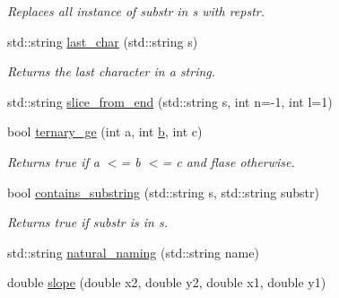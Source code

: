 \begin{DoxyCompactItemize}
\begin{DoxyCompactList}\small\item\em Replaces all instance of {\itshape substr} in {\itshape s} with {\itshape repstr}. \end{DoxyCompactList}\item 
std\+::string \hyperlink{namespacepyne_a97495e780a8fd91e4604e5a7b2f84f3e}{last\+\_\+char} (std\+::string s)\hypertarget{namespacepyne_a97495e780a8fd91e4604e5a7b2f84f3e}{}\label{namespacepyne_a97495e780a8fd91e4604e5a7b2f84f3e}

\begin{DoxyCompactList}\small\item\em Returns the last character in a string. \end{DoxyCompactList}\item 
std\+::string \hyperlink{namespacepyne_abe1c85ef0d36e8e3eeb02076db773c88}{slice\+\_\+from\+\_\+end} (std\+::string s, int n=-\/1, int l=1)
\item 
bool \hyperlink{namespacepyne_a5bf23fa851054a44f872c65f5592db8c}{ternary\+\_\+ge} (int a, int \hyperlink{namespacepyne_a12664d38214170260d6a69c4f5dda8da}{b}, int c)\hypertarget{namespacepyne_a5bf23fa851054a44f872c65f5592db8c}{}\label{namespacepyne_a5bf23fa851054a44f872c65f5592db8c}

\begin{DoxyCompactList}\small\item\em Returns true if {\itshape a} $<$= {\itshape b} $<$= {\itshape c} and flase otherwise. \end{DoxyCompactList}\item 
bool \hyperlink{namespacepyne_aacdc15f9fd3df02a25971257b3f83b47}{contains\+\_\+substring} (std\+::string s, std\+::string substr)\hypertarget{namespacepyne_aacdc15f9fd3df02a25971257b3f83b47}{}\label{namespacepyne_aacdc15f9fd3df02a25971257b3f83b47}

\begin{DoxyCompactList}\small\item\em Returns true if {\itshape substr} is in {\itshape s}. \end{DoxyCompactList}\item 
std\+::string \hyperlink{namespacepyne_aa136c046c495673c1167472b96901e33}{natural\+\_\+naming} (std\+::string name)
\item 
double \hyperlink{namespacepyne_a98db52b7243a761ad6f2819478eeda30}{slope} (double x2, double y2, double x1, double y1)\hypertarget{namespacepyne_a98db52b7243a761ad6f2819478eeda30}{}\label{namespacepyne_a98db52b7243a761ad6f2819478eeda30}


\end{DoxyCompactItemize}
